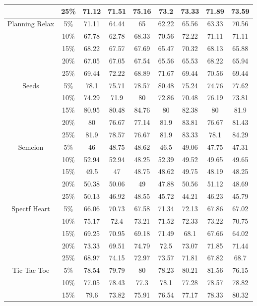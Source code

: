 \begin{longtable}[c]{|c|c|c|c|c|c|c|c|c|}
& 25\% & 71.12 & 71.51 & 75.16 & 73.2 & 73.33 & 71.89 & 73.59 \\ \hline
\multirow{5}{*}{Planning Relax}
& 5\% & 71.11 & 64.44 & 65 & 62.22 & 65.56 & 63.33 & 70.56 \\ 
& 10\% & 67.78 & 62.78 & 68.33 & 70.56 & 72.22 & 71.11 & 71.11 \\
& 15\% & 68.22 & 67.57 & 67.69 & 65.47 & 70.32 & 68.13 & 65.88 \\
& 20\% & 67.05 & 67.05 & 67.54 & 65.56 & 65.53 & 68.22 & 65.94 \\
& 25\% & 69.44 & 72.22 & 68.89 & 71.67 & 69.44 & 70.56 & 69.44 \\ \hline
\multirow{5}{*}{Seeds}
& 5\% & 78.1 & 75.71 & 78.57 & 80.48 & 75.24 & 74.76 & 77.62 \\ 
& 10\% & 74.29 & 71.9 & 80 & 72.86 & 70.48 & 76.19 & 73.81 \\
& 15\% & 80.95 & 80.48 & 84.76 & 80 & 82.38 & 80 & 81.9 \\
& 20\% & 80 & 76.67 & 77.14 & 81.9 & 83.81 & 76.67 & 81.43 \\
& 25\% & 81.9 & 78.57 & 76.67 & 81.9 & 83.33 & 78.1 & 84.29 \\ \hline
\multirow{5}{*}{Semeion}
& 5\% & 46 & 48.75 & 48.62 & 46.5 & 49.06 & 47.75 & 47.31 \\ 
& 10\% & 52.94 & 52.94 & 48.25 & 52.39 & 49.52 & 49.65 & 49.65 \\
& 15\% & 49.5 & 47 & 48.75 & 48.62 & 49.75 & 48.19 & 48.25 \\
& 20\% & 50.38 & 50.06 & 49 & 47.88 & 50.56 & 51.12 & 48.69 \\
& 25\% & 50.13 & 46.92 & 48.55 & 45.72 & 44.21 & 46.23 & 45.79 \\ \hline
\multirow{5}{*}{Spectf Heart}
& 5\% & 66.06 & 70.73 & 67.58 & 71.34 & 72.13 & 67.86 & 67.02 \\ 
& 10\% & 75.17 & 72.4 & 73.21 & 71.52 & 72.33 & 73.22 & 70.75 \\
& 15\% & 69.25 & 70.95 & 69.18 & 71.49 & 68.1 & 67.66 & 64.02 \\
& 20\% & 73.33 & 69.51 & 74.79 & 72.5 & 73.07 & 71.85 & 71.44 \\
& 25\% & 68.97 & 74.15 & 72.97 & 73.57 & 71.81 & 67.82 & 68.7 \\ \hline
\multirow{5}{*}{Tic Tac Toe}
& 5\% & 78.54 & 79.79 & 80 & 78.23 & 80.21 & 81.56 & 76.15 \\ 
& 10\% & 77.05 & 78.43 & 77.3 & 78.1 & 77.28 & 78.57 & 78.82 \\
& 15\% & 79.6 & 73.82 & 75.91 & 76.54 & 77.17 & 78.33 & 80.32 \\

\end{longtable}

